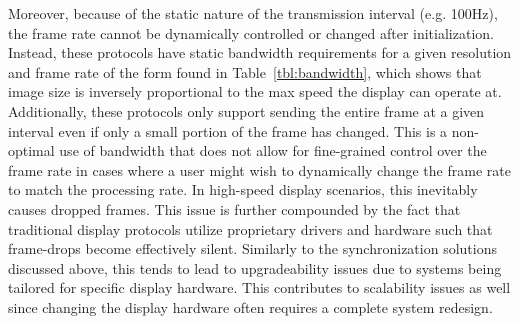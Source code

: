     Moreover, because of the static nature of the transmission interval (e.g. 100Hz), the frame rate cannot be dynamically controlled or changed after initialization. Instead, these protocols have static bandwidth requirements for a given resolution and frame rate of the form found in Table~\ref{tbl:bandwidth}, which shows that image size is inversely proportional to the max speed the display can operate at. Additionally, these protocols only support sending the entire frame at a given interval even if only a small portion of the frame has changed. This is a non-optimal use of bandwidth that does not allow for fine-grained control over the frame rate in cases where a user might wish to dynamically change the frame rate to match the processing rate. In high-speed display scenarios, this inevitably causes dropped frames. This issue is further compounded by the fact that traditional display protocols utilize proprietary drivers and hardware such that frame-drops become effectively silent. Similarly to the synchronization solutions discussed above, this tends to lead to upgradeability issues due to systems being tailored for specific display hardware. This contributes to scalability issues as well since changing the display hardware often requires a complete system redesign.


